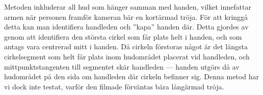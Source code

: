Metoden inkluderar all hud som hänger samman med
handen, vilket innefattar armen när personen framför kameran bär en kortärmad
tröja.
För att
kringgå detta kan man identifiera handleden och ''kapa'' handen
där. Detta gjordes av  genom att identifiera den 
största cirkel
som får plats helt i handen, och som antags vara centrerad mitt i handen. Då
cirkeln förstoras något är det längsta cirkelsegment som helt får
plats inom hudområdet placerat vid handleden, och mittpunktstangenten
till segmentet skär handleden --- handen utgörs då av hudområdet på den
sida om handleden där cirkeln befinner sig. Denna metod har vi dock
inte testat, varför den filmade förväntas bära
långärmad tröja. 
